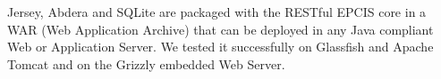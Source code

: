 Jersey, Abdera and SQLite are packaged with the RESTful EPCIS core in a WAR (Web Application Archive) that can be deployed in any Java compliant Web or Application Server. We tested it successfully on Glassfish and Apache Tomcat and on the Grizzly embedded Web Server.